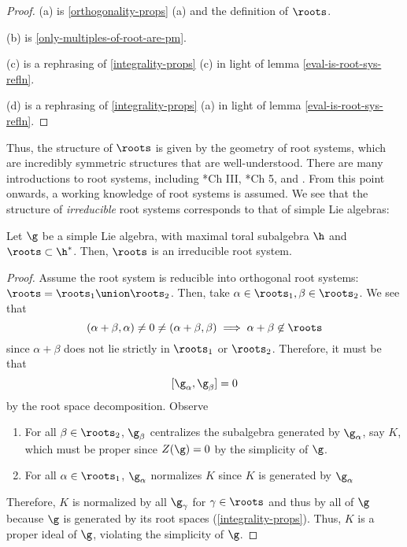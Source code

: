 \documentclass[11pt,leqno,oneside]{amsart}
\numberwithin{thm}{section}
\begin{document}
\begin{proof}
  (a) is \ref{orthogonality-props} (a) and the definition of
  \(\roots\).

  (b) is \ref{only-multiples-of-root-are-pm}.

  (c) is a rephrasing of \ref{integrality-props} (c) in light of lemma
  \ref{eval-is-root-sys-refln}.

  (d) is a rephrasing of \ref{integrality-props} (a) in light of lemma
  \ref{eval-is-root-sys-refln}. 
\end{proof}
Thus, the structure of \(\roots\) is given by the geometry of root
systems, which are incredibly symmetric structures that are
well-understood. There are many introductions to root systems,
including \cite{humph}*{Ch III}, \cite{carter}*{Ch 5}, and
\cite{root-systems}. From this point onwards, a working knowledge of
root systems is assumed. We see that the structure of
\emph{irreducible} root systems corresponds to that of simple Lie
algebras:
\begin{prop}
  Let \(\g\) be a simple Lie algebra, with maximal toral subalgebra
  \(\h\) and \(\roots \subset \h^*\). Then, \(\roots\) is an
  irreducible root system.
\end{prop}
\begin{proof}
  Assume the root system is reducible into orthogonal root systems:
  \(\roots = \roots_1 \union \roots_2\). Then, take \(\alpha \in
  \roots_1, \beta \in \roots_2\). We see that \[
    (\alpha+\beta,\alpha) \neq 0 \neq (\alpha+\beta,\beta) \implies
    \alpha+\beta \not \in \roots 
  \]
  since \(\alpha+\beta\) does not lie strictly in \(\roots_1\) or
  \(\roots_2\). Therefore, it must be that \[
    [\g_\alpha, \g_\beta] = 0
  \] by the root space decomposition. Observe
  \begin{enumerate}
  \item For all \(\beta \in \roots_2\), \(\g_\beta\) centralizes the
    subalgebra generated by 
    \(\g_\alpha\), say \(K\),
  which must be proper since \(Z(\g) = 0\) by the simplicity of
  \(\g\).
  \item For all \(\alpha \in \roots_1\), \(\g_\alpha\) normalizes
    \(K\) since \(K\) is generated by \(\g_\alpha\) 
  \end{enumerate}
  Therefore, \(K\) is normalized by all \(\g_\gamma\) for \(\gamma \in
  \roots\) and thus by all of \(\g\) because \(\g\) is generated by
  its root spaces (\ref{integrality-props}). Thus, \(K\) is a proper
  ideal of \(\g\), violating the simplicity of \(\g\).
\end{proof}
\end{document}
